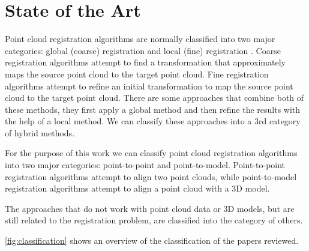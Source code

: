 

    \chapter{State of the Art}
    \label{chap:State of the Art}
    Point cloud registration algorithms are normally classified into two major categories: global (coarse) registration and local (fine) registration \cite{Quan_2020_com,Kim_2011_fully}.
    Coarse registration algorithms attempt to find a transformation that approximately maps the source point cloud to the target point cloud. 
    Fine registration algorithms attempt to refine an initial transformation to map the source point cloud to the target point cloud.
    There are some approaches that combine both of these methods, they first apply a global method and then refine the results with the help of a local method. 
    We can classify these approaches into a 3rd category of hybrid methods. 
    \par
    
    For the purpose of this work we can classify point cloud registration algorithms into two major categories:
    point-to-point and point-to-model.
    Point-to-point registration algorithms attempt to align two point clouds, while point-to-model registration algorithms attempt to align a point cloud with a 3D model.

    The approaches that do not work with point cloud data or 3D models, but are still related to the registration problem, are classified into the category of others.

    \autoref{fig:classification} shows an overview of the classification of the papers reviewed.
    
